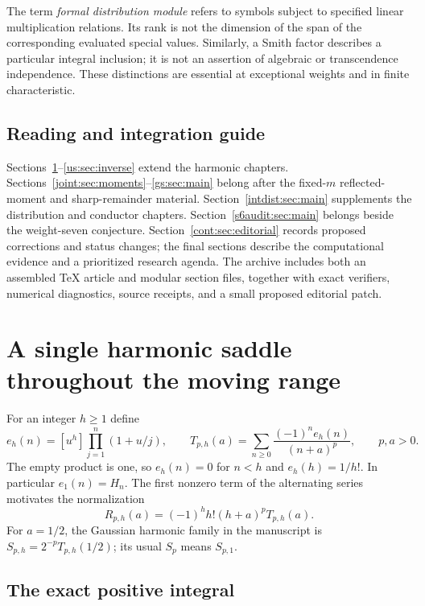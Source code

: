 \documentclass[11pt,a4paper]{article}
\numberwithin{equation}{section}
\theoremstyle{plain}
\theoremstyle{definition}
\theoremstyle{remark}
\begin{document}
The term \emph{formal distribution module} refers to symbols subject
to specified linear multiplication relations. Its rank is not the
dimension of the span of the corresponding evaluated special values.
Similarly, a Smith factor describes a particular integral inclusion;
it is not an assertion of algebraic or transcendence independence.
These distinctions are essential at exceptional weights and in finite
characteristic.

\subsection{Reading and integration guide}

Sections~\ref{us:sec:uniform}--\ref{us:sec:inverse} extend the harmonic
chapters. Sections~\ref{joint:sec:moments}--\ref{gs:sec:main} belong
after the fixed-$m$ reflected-moment and sharp-remainder material.
Section~\ref{intdist:sec:main} supplements the distribution and
conductor chapters. Section~\ref{s6audit:sec:main} belongs beside the
weight-seven conjecture. Section~\ref{cont:sec:editorial} records
proposed corrections and status changes; the final sections describe
the computational evidence and a prioritized research agenda.
The archive includes both an assembled \TeX{} article and modular
section files, together with exact verifiers, numerical diagnostics,
source receipts, and a small proposed editorial patch.


\section{A single harmonic saddle throughout the moving range}
\label{us:sec:uniform}

For an integer $h\ge1$ define
\[
 e_h(n)=[u^h]\prod_{j=1}^n(1+u/j),\qquad
 T_{p,h}(a)=\sum_{n\ge0}\frac{(-1)^ne_h(n)}{(n+a)^p},
 \qquad p,a>0.
\]
The empty product is one, so $e_h(n)=0$ for $n<h$ and
$e_h(h)=1/h!$. In particular $e_1(n)=H_n$. The first nonzero
term of the alternating series motivates the normalization
\begin{equation}\label{us:eq:R}
 R_{p,h}(a)=(-1)^hh!(h+a)^pT_{p,h}(a).
\end{equation}
For $a=1/2$, the Gaussian harmonic family in the manuscript is
$S_{p,h}=2^{-p}T_{p,h}(1/2)$; its usual $S_p$ means $S_{p,1}$.

\subsection{The exact positive integral}
\end{document}
